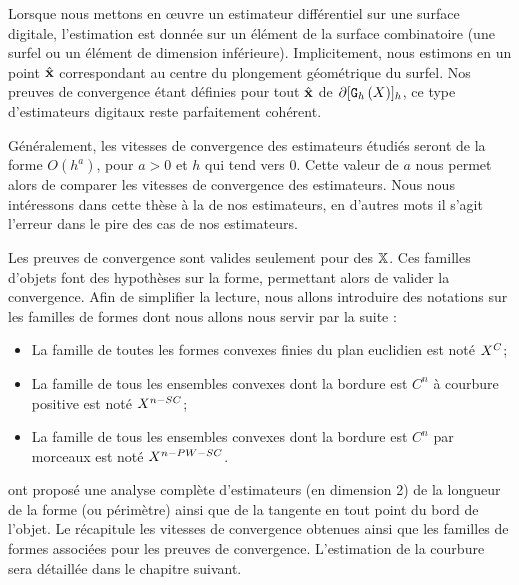 Lorsque nous mettons en œuvre un estimateur différentiel sur une surface digitale,
l'estimation est donnée sur un élément de la surface combinatoire (une surfel ou
un élément de dimension inférieure). Implicitement, nous estimons en un point
$\hat{\mathbf{x}}$ correspondant au centre du plongement géométrique du surfel. Nos
preuves de convergence étant définies pour tout $\hat{\mathbf{x}}$ de $\partial
\lbrack \mathtt{G}_{h}\left(X\right) \rbrack_{h}$, ce type d'estimateurs digitaux reste
parfaitement cohérent.

Généralement, les vitesses de convergence des estimateurs étudiés seront de la
forme $O(h^a)$, pour $a > 0$ et $h$ qui tend vers $0$. Cette valeur de $a$ nous
permet alors de comparer les vitesses de convergence des estimateurs. Nous nous
intéressons dans cette thèse à la 
de nos estimateurs, en d'autres mots il s'agit l'erreur dans le pire des cas de
nos estimateurs.

Les preuves de convergence sont valides seulement pour des  $\mathbb{X}$. Ces familles d'objets font des hypothèses sur la forme,
permettant alors de valider la convergence. Afin de simplifier la lecture, nous
allons introduire des notations sur les familles de formes dont nous allons nous
servir par la suite :
%
\begin{itemize}
  \item La famille de toutes les formes convexes finies du plan euclidien est noté $X^{C}$;
  \item La famille de tous les ensembles convexes dont la bordure est $C^n$ à courbure positive est noté $X^{n-SC}$;
  \item La famille de tous les ensembles convexes dont la bordure est $C^n$ par morceaux est noté $X^{n-PW-SC}$.
\end{itemize}
%
%

 ont proposé une analyse
complète d'estimateurs (en dimension 2) de la longueur de la forme (ou
périmètre) ainsi que de la tangente en tout point du bord de l'objet. Le
 récapitule les vitesses de convergence obtenues ainsi
que les familles de formes associées pour les preuves de convergence.
L'estimation de la courbure sera détaillée dans le chapitre suivant.


